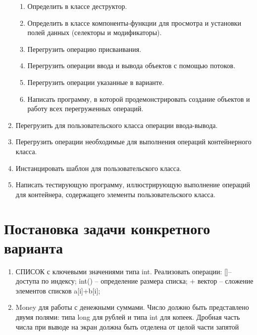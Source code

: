 \begin{enumerate}
\begin{enumerate}
            \item Определить в классе деструктор.
            \item Определить в классе компоненты-функции для просмотра и установки полей данных (селекторы и модификаторы).
            \item Перегрузить операцию присваивания.
            \item Перегрузить операции ввода и вывода объектов с помощью потоков.
            \item Перегрузить операции указанные в варианте.
            \item Написать программу, в которой продемонстрировать создание объектов и работу всех перегруженных операций.
        \end{enumerate}

        \item Перегрузить для пользовательского класса операции ввода-вывода.
        \item Перегрузить операции необходимые для выполнения операций контейнерного класса.
        \item Инстанцировать шаблон для пользовательского класса.
        \item Написать тестирующую программу, иллюстрирующую выполнение операций для контейнера, содержащего элементы пользовательского класса.
    \end{enumerate}
    \newpage
    \section{Постановка задачи конкретного варианта}
    \begin{enumerate}
     \item СПИСОК с ключевыми значениями типа int. Реализовать операции: []– доступа по индексу; int() – определение размера списка; + вектор – сложение элементов списков a[i]+b[i];
     \item Money для работы с денежными суммами. Число должно быть представлено двумя полями: типа long для рублей и типа int для копеек. Дробная часть числа при выводе на экран должна быть отделена от целой части запятой

    \end{enumerate}

